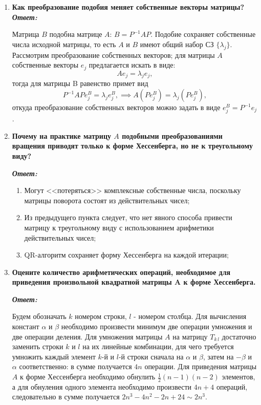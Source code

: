 \documentclass[12pt, a4paper]{article}
\begin{document}
\begin{enumerate}
	\item \textbf{Как преобразование подобия меняет собственные векторы матрицы?}
	\vspace*{0.2cm}
	\textit{\textbf{Ответ:}}
	
	Матрица $B$ подобна матрице $A$: $B = P^{-1} A P$. Подобие сохраняет собственные числа исходной матрицы, то есть $A$ и $B$ имеют общий набор СЗ $ \{ \lambda_j \}$. Рассмотрим преобразование собственных векторов; для матрицы $A$ собственные векторы $e_j$ предлагается искать в виде:
	$$
	A e_j = \lambda_j e_j,
	$$
	тогда для матрицы B равенство примет вид
	$$
	P^{-1} A P e^{B}_j = \lambda_j e^B_j, \implies A \left( P e^B_j \right) = \lambda_j (P e^B_j),
	$$
	откуда преобразование собственных векторов можно задать в виде $e^B_j = P^{-1} e_j$.
	
	
	
	\item \textbf{Почему на практике матрицу $A$ подобными преобразованиями вращения приводят только к форме Хессенберга, но не к треугольному виду?}
	
	\vspace*{0.2cm}
	
	\textit{\textbf{Ответ:}}
	\begin{enumerate}
		\item Могут <<потеряться>> комплексные собственные числа, поскольку матрицы поворота состоят из действительных чисел;
		\item Из предыдущего пункта следует, что нет явного способа привести матрицу к треугольному виду с использованием арифметики действительных чисел; 
		\item QR-алгоритм сохраняет форму Хессенберга на каждой итерации;
	\end{enumerate}

	
	\item \textbf{Оцените количество арифметических операций, необходимое для приведения произвольной квадратной матрицы A
		к форме Хессенберга.}
	\vspace*{0.2cm}
	
	\textit{\textbf{Ответ:}}
	
	Будем обозначать $k$ номером строки, $l$ - номером столбца. Для вычисления констант $\alpha$ и $\beta$ необходимо произвести минимум две операции умножения и две операции деления. Для умножения матрицы $A$ на матрицу $T_{k \,l}$ достаточно заменить строки $k$ и $l$ на их линейные комбинации, для чего требуется умножить каждый элемент $k$-й и $l$-й строки сначала на $\alpha$ и $\beta$, затем на $-\beta$ и $\alpha$ соответственно: в сумме получается $4n$ операции. Для приведения матрицы $A$ к форме Хессенберга необходимо обнулить $\frac{1}{2}(n-1)(n-2)$ элементов, а для обнуления одного элемента необходимо произвести $4n + 4$ операций, следовательно в сумме получается $2 n^3 - 4n^2 - 2n + 24 \sim 2 n^3$.
	

\end{enumerate}
\end{document}
